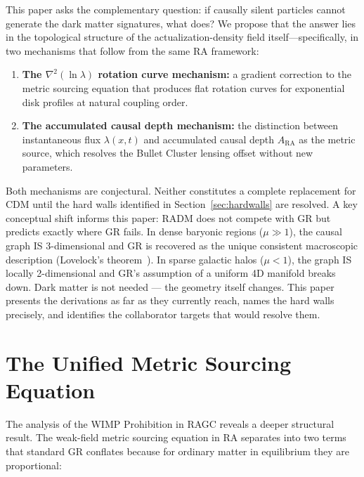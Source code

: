 \documentclass[11pt,a4paper]{article}
\theoremstyle{plain}
\theoremstyle{definition}
\theoremstyle{remark}
\begin{document}
This paper asks the complementary question: if causally silent particles cannot
generate the dark matter signatures, what does? We propose that the answer lies in
the topological structure of the actualization-density field itself---specifically,
in two mechanisms that follow from the same RA framework:

\begin{enumerate}[noitemsep]
  \item \textbf{The $\nabla^2(\ln\lambda)$ rotation curve mechanism:} a gradient
  correction to the metric sourcing equation that produces flat rotation curves
  for exponential disk profiles at natural coupling order.
  \item \textbf{The accumulated causal depth mechanism:} the distinction between
  instantaneous flux $\lambda(x,t)$ and accumulated causal depth $A_{\mathrm{RA}}$
  as the metric source, which resolves the Bullet Cluster lensing offset without
  new parameters.
\end{enumerate}

Both mechanisms are conjectural. Neither constitutes a complete replacement for
CDM until the hard walls identified in Section~\ref{sec:hardwalls} are resolved.
A key conceptual shift informs this paper: RADM does not compete with GR
but predicts exactly where GR fails. In dense baryonic regions ($\mu \gg 1$),
the causal graph IS 3-dimensional and GR is recovered as the unique
consistent macroscopic description (Lovelock's theorem~\citep{Sandeman2026b}).
In sparse galactic halos ($\mu < 1$), the graph IS locally 2-dimensional
and GR's assumption of a uniform 4D manifold breaks down. Dark matter is not
needed --- the geometry itself changes. This paper presents the derivations
as far as they currently reach, names the hard walls precisely, and identifies
the collaborator targets that would resolve them.

\section{The Unified Metric Sourcing Equation}
\label{sec:sourcing}

The analysis of the WIMP Prohibition in RAGC reveals a deeper structural result.
The weak-field metric sourcing equation in RA separates into two terms that
standard GR conflates because for ordinary matter in equilibrium they are
proportional:
\end{document}

